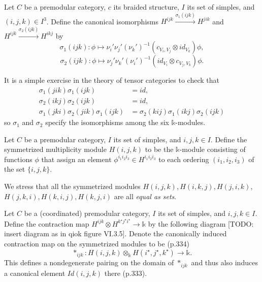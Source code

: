 \begin{definition}\label{def/canonical-isomorphism}
  Let $C$ be a premodular category, $c$ its braided structure,
  $I$ its set of simples, and $(i,j,k) \in I^{3}$. Define the
  canonical isomorphisms
  $H^{ijk} \xrightarrow{\sigma_{1}(ijk)} H^{jik}$ and
  $H^{ijk} \xrightarrow{\sigma_{2}(ijk)} H^{ikj}$ by
  $$\sigma_{1}(ijk): \phi \mapsto \nu_{i}'\nu_{j}'(\nu_{k}')^{-1}(c_{V_{i}, V_{j}} \otimes id_{V_{k}})\phi,$$
  $$\sigma_{2}(ijk): \phi \mapsto \nu_{j}'\nu_{k}'(\nu_{i}')^{-1}(id_{V_{i}} \otimes c_{V_{j}, V_{k}})\phi.$$
\end{definition}

\noindent It is a simple exercise in the theory of tensor
categories to check that
\begin{equation} \label{eq1}
  \begin{split}
    \sigma_{1}(jik)\sigma_{1}(ijk) & = id, \\
    \sigma_{2}(ikj)\sigma_{2}(ijk) & = id, \\
    \sigma_{1}(jki)\sigma_{2}(jik)\sigma_{1}(ijk) & = \sigma_{2}(kij)\sigma_{1}(ikj)\sigma_{2}(ijk)
  \end{split}
\end{equation}
so $\sigma_{1}$ and $\sigma_{2}$ specify the isomorphisms among
the six $\mathbb{k}$-modules.

\begin{definition}\label{def/symmetrized-multiplicity-module}
  Let $C$ be a premodular category, $I$ its set of simples, and
  $i, j, k \in I$. Define the symmetrized multiplicity module
  $H(i,j,k)$ to be the $\mathbb{k}$-module consisting of
  functions $\phi$ that assign an element
  $\phi^{i_{1}i_{2}i_{3}} \in H^{i_{1}i_{2}i_{3}}$ to each
  ordering $(i_{1}, i_{2}, i_{3})$ of the set $\{i, j, k\}$.
\end{definition}

\noindent We stress that all the symmetrized modules
$H(i,j,k), H(i,k,j), H(j,i,k)$, $H(j,k,i), H(k,i,j), H(k,j,i)$
are all \textit{equal as sets}.

\begin{definition}[contraction]\label{def/contraction}
  Let $C$ be a (coordinated) premodular category, $I$ its set of
  simples, and $i, j, k \in I$. Define the contraction map
  $H^{ijk} \otimes H^{k^{\star}j^{\star}i^{\star}} \to \mathbb{k}$
  by the following diagram [TODO: insert diagram as in qiok
  figure VI.3.5]. Denote the canonically induced contraction map
  on the symmetrized modules to be (p.334)
  $$\ast_{ijk}: H(i,j,k) \otimes_{\mathbb{k}} H(i^{\star}, j^{\star}, k^{\star}) \to \mathbb{k}.$$
  This defines a nondegenerate pairing on the domain of
  $\ast_{ijk}$ and thus also induces a canonical element
  $Id(i,j,k)$ there (p.333).
\end{definition}

